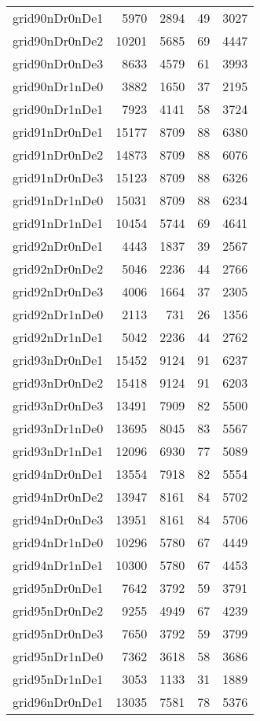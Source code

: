 \documentclass[../../../thesis.tex]{subfiles}
\begin{document}
\begin{longtable}{lrrrr}
grid90nDr0nDe1 & 5970 & 2894 & 49 & 3027 \\
grid90nDr0nDe2 & 10201 & 5685 & 69 & 4447 \\
grid90nDr0nDe3 & 8633 & 4579 & 61 & 3993 \\
grid90nDr1nDe0 & 3882 & 1650 & 37 & 2195 \\
grid90nDr1nDe1 & 7923 & 4141 & 58 & 3724 \\
grid91nDr0nDe1 & 15177 & 8709 & 88 & 6380 \\
grid91nDr0nDe2 & 14873 & 8709 & 88 & 6076 \\
grid91nDr0nDe3 & 15123 & 8709 & 88 & 6326 \\
grid91nDr1nDe0 & 15031 & 8709 & 88 & 6234 \\
grid91nDr1nDe1 & 10454 & 5744 & 69 & 4641 \\
grid92nDr0nDe1 & 4443 & 1837 & 39 & 2567 \\
grid92nDr0nDe2 & 5046 & 2236 & 44 & 2766 \\
grid92nDr0nDe3 & 4006 & 1664 & 37 & 2305 \\
grid92nDr1nDe0 & 2113 & 731 & 26 & 1356 \\
grid92nDr1nDe1 & 5042 & 2236 & 44 & 2762 \\
grid93nDr0nDe1 & 15452 & 9124 & 91 & 6237 \\
grid93nDr0nDe2 & 15418 & 9124 & 91 & 6203 \\
grid93nDr0nDe3 & 13491 & 7909 & 82 & 5500 \\
grid93nDr1nDe0 & 13695 & 8045 & 83 & 5567 \\
grid93nDr1nDe1 & 12096 & 6930 & 77 & 5089 \\
grid94nDr0nDe1 & 13554 & 7918 & 82 & 5554 \\
grid94nDr0nDe2 & 13947 & 8161 & 84 & 5702 \\
grid94nDr0nDe3 & 13951 & 8161 & 84 & 5706 \\
grid94nDr1nDe0 & 10296 & 5780 & 67 & 4449 \\
grid94nDr1nDe1 & 10300 & 5780 & 67 & 4453 \\
grid95nDr0nDe1 & 7642 & 3792 & 59 & 3791 \\
grid95nDr0nDe2 & 9255 & 4949 & 67 & 4239 \\
grid95nDr0nDe3 & 7650 & 3792 & 59 & 3799 \\
grid95nDr1nDe0 & 7362 & 3618 & 58 & 3686 \\
grid95nDr1nDe1 & 3053 & 1133 & 31 & 1889 \\
grid96nDr0nDe1 & 13035 & 7581 & 78 & 5376 \\

\end{longtable}
\end{document}
